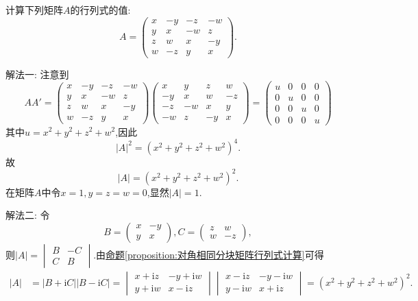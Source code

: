 \documentclass[../../main.tex]{subfiles}%
\begin{document}
\begin{example}
计算下列矩阵\(A\)的行列式的值:
\[
A = 
\begin{pmatrix}
x & -y & -z & -w\\
y & x & -w & z\\
z & w & x & -y\\
w & -z & y & x
\end{pmatrix}.
\]
\end{example}
\begin{solution}

{\color{blue}解法一:}
注意到
\[
AA' = 
\begin{pmatrix}
x & -y & -z & -w\\
y & x & -w & z\\
z & w & x & -y\\
w & -z & y & x
\end{pmatrix}
\begin{pmatrix}
x & y & z & w\\
-y & x & w & -z\\
-z & -w & x & y\\
-w & z & -y & x
\end{pmatrix}
=
\begin{pmatrix}
u & 0 & 0 & 0\\
0 & u & 0 & 0\\
0 & 0 & u & 0\\
0 & 0 & 0 & u
\end{pmatrix}
\]
其中\(u = x^2 + y^2 + z^2 + w^2\),因此
\[
|A|^2=(x^2 + y^2 + z^2 + w^2)^4.
\]
故
\[
|A|=(x^2 + y^2 + z^2 + w^2)^2.
\]
在矩阵\(A\)中令\(x = 1,y = z = w = 0\),显然\(|A| = 1\).

{\color{blue}解法二:}
令
\[
B = 
\begin{pmatrix}
x & -y\\
y & x
\end{pmatrix},
C = 
\begin{pmatrix}
z & w\\
w & -z
\end{pmatrix},
\]
则\(|A| = 
\begin{vmatrix}
B & -C\\
C & B
\end{vmatrix}\).由\hyperref[proposition:对角相同分块矩阵行列式计算]{命题\ref{proposition:对角相同分块矩阵行列式计算}}可得
\begin{align*}
|A|&=|B + \mathrm{i}C||B - \mathrm{i}C|
=\begin{vmatrix}
x + \mathrm{i}z & -y + \mathrm{i}w\\
y + \mathrm{i}w & x - \mathrm{i}z
\end{vmatrix}\begin{vmatrix}
x - \mathrm{i}z & -y - \mathrm{i}w\\
y - \mathrm{i}w & x + \mathrm{i}z
\end{vmatrix}
=(x^2 + y^2 + z^2 + w^2)^2.
\end{align*}

\end{solution}
\end{document}
